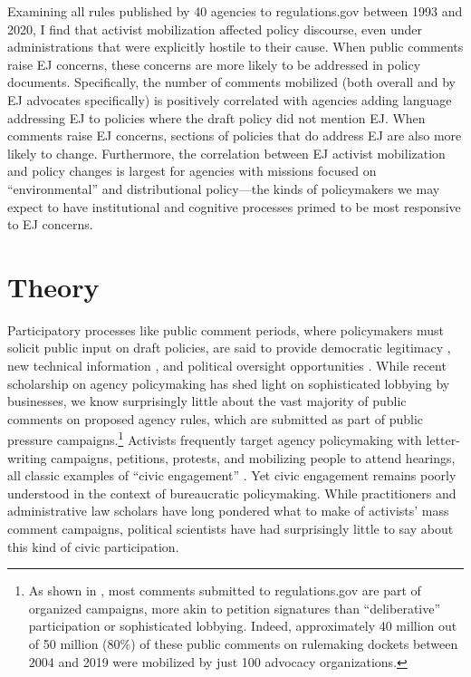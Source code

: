 \documentclass[
      12pt,
        ]{article}
\begin{document}
Examining all rules published by 40 agencies to regulations.gov between 1993 and 2020, I find that activist mobilization affected policy discourse, even under administrations that were explicitly hostile to their cause. When public comments raise
EJ concerns, these concerns are more likely to be
addressed in policy documents. Specifically, the number of comments mobilized (both overall and by EJ advocates specifically) is positively correlated with agencies adding language addressing EJ to policies where the draft policy did not mention EJ. When comments raise EJ concerns, sections of policies that do address EJ are also more likely to change.
Furthermore, the correlation between EJ activist mobilization and policy changes is largest for agencies with missions focused on ``environmental'' and distributional policy---the kinds of policymakers we may expect to have institutional and cognitive processes primed to be most responsive to EJ concerns.

\hypertarget{theory}{%
\section{Theory}\label{theory}}

Participatory processes like public comment periods, where policymakers must solicit public input on draft policies, are said to provide democratic legitimacy \citep{Croley2003, Rosenbloom2003}, new technical information \citep{Yackee2006JPART, Nelson2012}, and political oversight opportunities \citep{Balla1998, Mccubbins1984}. While recent scholarship on agency policymaking has shed light on sophisticated lobbying by businesses, we know surprisingly little about the vast majority of public comments on proposed agency rules, which are submitted as part of public pressure campaigns.\footnote{
  As shown in \citet{judgelord2019SPSA}, most comments submitted to
  regulations.gov are part of organized campaigns, more akin to petition signatures than ``deliberative'' participation or sophisticated lobbying. Indeed, approximately 40 million out of
  50 million (80\%) of these public comments on rulemaking dockets between 2004 and 2019 were mobilized by just 100
  advocacy organizations.}
Activists frequently target agency policymaking with letter-writing campaigns, petitions, protests,
and mobilizing people to attend hearings, all classic examples of ``civic engagement'' \citep{Verba1987}. Yet civic engagement remains poorly understood in the context of bureaucratic policymaking.
While practitioners and administrative law scholars have long pondered
what to make of activists' mass comment campaigns, political scientists have had
surprisingly little to say about this kind of civic participation.
\end{document}
